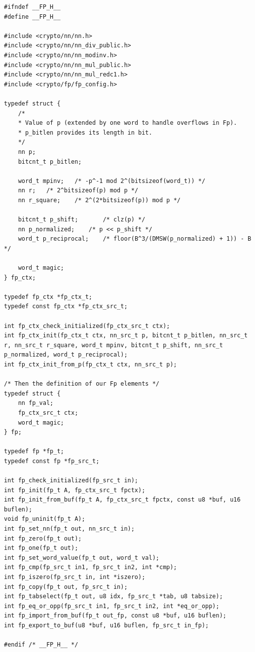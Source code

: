 \begin{lstlisting}[style=cstyle, caption={include/fp/fp.h}, captionpos=t]
#ifndef __FP_H__
#define __FP_H__

#include <crypto/nn/nn.h>
#include <crypto/nn/nn_div_public.h>
#include <crypto/nn/nn_modinv.h>
#include <crypto/nn/nn_mul_public.h>
#include <crypto/nn/nn_mul_redc1.h>
#include <crypto/fp/fp_config.h>

typedef struct {
	/*
	* Value of p (extended by one word to handle overflows in Fp). 
	* p_bitlen provides its length in bit.
	*/
	nn p;
	bitcnt_t p_bitlen;
	
	word_t mpinv;	/* -p^-1 mod 2^(bitsizeof(word_t)) */
	nn r;	/* 2^bitsizeof(p) mod p */
	nn r_square;	/* 2^(2*bitsizeof(p)) mod p */

	bitcnt_t p_shift;		/* clz(p) */
	nn p_normalized;	/* p << p_shift */
	word_t p_reciprocal;	/* floor(B^3/(DMSW(p_normalized) + 1)) - B */
	
	word_t magic;
} fp_ctx;

typedef fp_ctx *fp_ctx_t;
typedef const fp_ctx *fp_ctx_src_t;

int fp_ctx_check_initialized(fp_ctx_src_t ctx);
int fp_ctx_init(fp_ctx_t ctx, nn_src_t p, bitcnt_t p_bitlen, nn_src_t r, nn_src_t r_square, word_t mpinv, bitcnt_t p_shift, nn_src_t p_normalized, word_t p_reciprocal);
int fp_ctx_init_from_p(fp_ctx_t ctx, nn_src_t p);

/* Then the definition of our Fp elements */
typedef struct {
	nn fp_val;
	fp_ctx_src_t ctx;
	word_t magic;
} fp;

typedef fp *fp_t;
typedef const fp *fp_src_t;

int fp_check_initialized(fp_src_t in);
int fp_init(fp_t A, fp_ctx_src_t fpctx);
int fp_init_from_buf(fp_t A, fp_ctx_src_t fpctx, const u8 *buf, u16 buflen);
void fp_uninit(fp_t A);
int fp_set_nn(fp_t out, nn_src_t in);
int fp_zero(fp_t out);
int fp_one(fp_t out);
int fp_set_word_value(fp_t out, word_t val);
int fp_cmp(fp_src_t in1, fp_src_t in2, int *cmp);
int fp_iszero(fp_src_t in, int *iszero);
int fp_copy(fp_t out, fp_src_t in);
int fp_tabselect(fp_t out, u8 idx, fp_src_t *tab, u8 tabsize);
int fp_eq_or_opp(fp_src_t in1, fp_src_t in2, int *eq_or_opp);
int fp_import_from_buf(fp_t out_fp, const u8 *buf, u16 buflen);
int fp_export_to_buf(u8 *buf, u16 buflen, fp_src_t in_fp);

#endif /* __FP_H__ */
\end{lstlisting}

